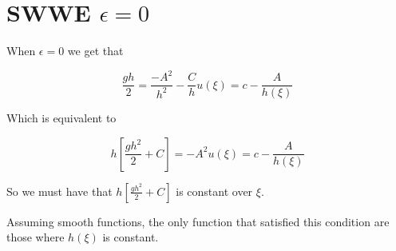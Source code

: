 \documentclass[subeqn]{article}
\begin{document}
\section{SWWE $\epsilon = 0$}
When $\epsilon = 0$ we get that

\begin{subequations}
	\begin{equation*}
	\frac{gh}{2}  =  \frac{-{A^2}}{h^2} - \frac{C}{h}
	\end{equation*}
	\begin{equation*}
	u(\xi) = c - \frac{A}{h(\xi)}
	\end{equation*}
\end{subequations}

Which is equivalent to

\begin{subequations}
	\begin{equation*}
	h \left[\frac{gh^2}{2} + C \right]  =  -A^2
	\end{equation*}
	\begin{equation*}
	u(\xi) = c - \frac{A}{h(\xi)}
	\end{equation*}
\end{subequations}

So we must have that $h \left[\frac{gh^2}{2} + C \right]$ is constant over $\xi$. 

Assuming smooth functions, the only function that satisfied this condition are those where $h(\xi)$ is constant. 
\end{document}
